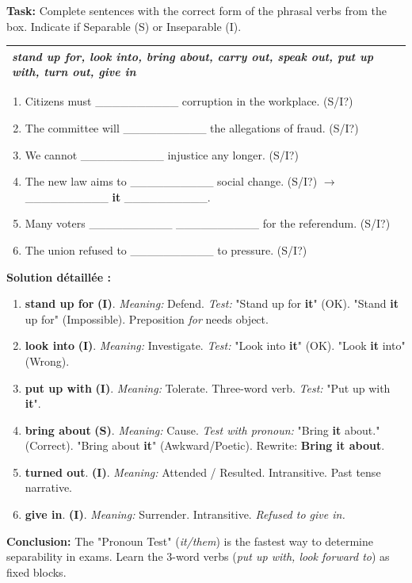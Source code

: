 \documentclass[11pt]{article}
\begin{document}
\begin{exoresolu}
    \textbf{Task:} Complete sentences with the correct form of the phrasal verbs from the box. Indicate if Separable (S) or Inseparable (I).
    \vspace{0.2cm}
    \begin{center}
        \begin{tabularx}{\linewidth}{|X|}\hline
            \emph{stand up for, look into, bring about, carry out, speak out, put up with, turn out, give in} \\ \hline
        \end{tabularx}
    \end{center}
    \begin{enumerate}
        \item Citizens must \_\_\_\_\_\_\_\_\_\_ corruption in the workplace. (S/I?)
        \item The committee will \_\_\_\_\_\_\_\_\_\_ the allegations of fraud. (S/I?)
        \item We cannot \_\_\_\_\_\_\_\_\_\_ injustice any longer. (S/I?)
        \item The new law aims to \_\_\_\_\_\_\_\_\_\_ social change. (S/I?) $\to$ \_\_\_\_\_\_\_\_\_\_ \textbf{it} \_\_\_\_\_\_\_\_\_\_.
        \item Many voters \_\_\_\_\_\_\_\_\_\_ \_\_\_\_\_\_\_\_\_\_ for the referendum. (S/I?)
        \item The union refused to \_\_\_\_\_\_\_\_\_\_ to pressure. (S/I?)
    \end{enumerate}
    \tcblower
    \textbf{Solution détaillée :}
    \begin{enumerate}
        \item \textbf{stand up for} \textbf{(I)}. \textit{Meaning:} Defend. \textit{Test:} "Stand up for \textbf{it}" (OK). "Stand \textbf{it} up for" (Impossible). Preposition \emph{for} needs object.
        \item \textbf{look into} \textbf{(I)}. \textit{Meaning:} Investigate. \textit{Test:} "Look into \textbf{it}" (OK). "Look \textbf{it} into" (Wrong).
        \item \textbf{put up with} \textbf{(I)}. \textit{Meaning:} Tolerate. Three-word verb. \textit{Test:} "Put up with \textbf{it}".
        \item \textbf{bring about} \textbf{(S)}. \textit{Meaning:} Cause. \textit{Test with pronoun:} "Bring \textbf{it} about." (Correct). "Bring about \textbf{it}" (Awkward/Poetic). Rewrite: \textbf{Bring it about}.
        \item \textbf{turned out}. \textbf{(I)}. \textit{Meaning:} Attended / Resulted. Intransitive. Past tense narrative.
        \item \textbf{give in}. \textbf{(I)}. \textit{Meaning:} Surrender. Intransitive. \textit{Refused to give in.}
    \end{enumerate}
    \textbf{Conclusion:} The "Pronoun Test" (\emph{it/them}) is the fastest way to determine separability in exams. Learn the 3-word verbs (\emph{put up with, look forward to}) as fixed blocks.
\end{exoresolu}
\end{document}
